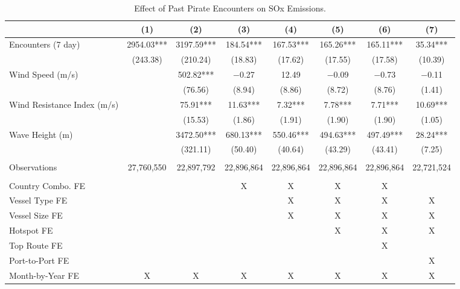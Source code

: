 \begin{table}
\centering
\caption{Effect of Past Pirate Encounters on SOx Emissions. \label{tab:spec-sox-table-rev}}
\centering
\begin{adjustbox}{width = .9\textwidth}
\begin{threeparttable}
\begin{tabular}[t]{lccccccc}
\toprule
  & (1) & (2) & (3) & (4) & (5) & (6) & (7)\\
\midrule
Encounters (7 day) & \num{2954.03}*** & \num{3197.59}*** & \num{184.54}*** & \num{167.53}*** & \num{165.26}*** & \num{165.11}*** & \num{35.34}***\\
 & (\num{243.38}) & (\num{210.24}) & (\num{18.83}) & (\num{17.62}) & (\num{17.55}) & (\num{17.58}) & (\num{10.39})\\
Wind Speed (m/s) &  & \num{502.82}*** & \num{-0.27} & \num{12.49} & \num{-0.09} & \num{-0.73} & \num{-0.11}\\
 &  & (\num{76.56}) & (\num{8.94}) & (\num{8.86}) & (\num{8.72}) & (\num{8.76}) & (\num{1.41})\\
Wind Resistance Index (m/s) &  & \num{75.91}*** & \num{11.63}*** & \num{7.32}*** & \num{7.78}*** & \num{7.71}*** & \num{10.69}***\\
 &  & (\num{15.53}) & (\num{1.86}) & (\num{1.91}) & (\num{1.90}) & (\num{1.90}) & (\num{1.05})\\
Wave Height (m) &  & \num{3472.50}*** & \num{680.13}*** & \num{550.46}*** & \num{494.63}*** & \num{497.49}*** & \num{28.24}***\\
 &  & (\num{321.11}) & (\num{50.40}) & (\num{40.64}) & (\num{43.29}) & (\num{43.41}) & (\num{7.25})\\
 &  &  &  &  &  &  & \\
Observations & 27,760,550 & 22,897,792 & 22,896,864 & 22,896,864 & 22,896,864 & 22,896,864 & 22,721,524\\
 &  &  &  &  &  &  & \\
Country Combo. FE &  &  & X & X & X & X & \\
Vessel Type FE &  &  &  & X & X & X & X\\
Vessel Size FE &  &  &  & X & X & X & X\\
Hotspot FE &  &  &  &  & X & X & X\\
Top Route FE &  &  &  &  &  & X & \\
Port-to-Port FE &  &  &  &  &  &  & X\\
Month-by-Year FE & X & X & X & X & X & X & X\\
\bottomrule
\end{tabular}

\end{threeparttable}
\end{adjustbox}
\end{table}
